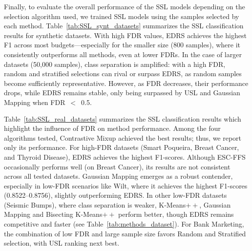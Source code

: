 \documentclass[preprint,12pt]{elsarticle}
\begin{document}
Finally, to evaluate the overall performance of the SSL models depending on the selection algorithm used, we trained SSL models using the samples selected by each method. Table~\ref{tab:SSL_synt_datasets} summarizes the SSL classification results for synthetic datasets. With high FDR values, EDRS achieves the highest F1 across most budgets—especially for the smaller size (800 samples), where it consistently outperforms all methods, even at lower FDRs. In the case of larger datasets (50,000 samples), class separation is amplified: with a high FDR, random and stratified selections can rival or surpass EDRS, as random samples become sufficiently representative. However, as FDR decreases, their performance drops, while EDRS remains stable, only being surpassed by USL and Gaussian Mapping when FDR~$<$~0.5.

Table~\ref{tab:SSL_real_datasets} summarizes the SSL classification results which highlight the influence of FDR on method performance. Among the four algorithms tested, Contrastive Mixup achieved the best results; thus, we report only its performance. For high-FDR datasets (Smart Poqueira, Breast Cancer, and Thyroid Disease), EDRS achieves the highest F1-scores. Although ESC-FFS occasionally performs well (on Breast Cancer), its results are not consistent across all tested datasets. Gaussian Mapping emerges as a robust contender, especially in low-FDR scenarios like Wilt, where it achieves the highest F1-scores (0.8522–0.8756), slightly outperforming EDRS. In other low-FDR datasets (Seismic Bumps), where class separation is weaker, K-Means$++$, Gaussian Mapping and Bisecting K-Means$++$ perform better, though EDRS remains competitive and faster (see Table~\ref{tab:methods_dataset}). For Bank Marketing, the combination of low FDR and large sample size favors Random and Stratified selection, with USL ranking next best.
\end{document}
